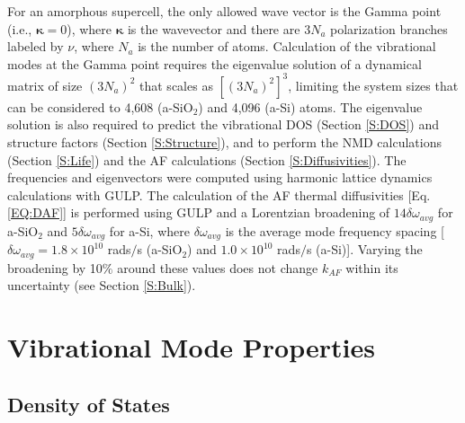 For an amorphous supercell, 
the only allowed wave vector is the Gamma point 
(i.e., $\pmb{\kappa}=0$),  
where $\pmb{\kappa}$ is the wavevector and there are $3N_a$ 
polarization 
branches labeled by $\nu$, where $N_a$ is the number of atoms. 
Calculation of the vibrational modes at the Gamma point  
requires the eigenvalue solution of a dynamical matrix of size 
$(3N_a)^2$ that scales as $[(3N_a)^2]^3$, limiting the system 
sizes that can be considered to 4,608 (a-SiO$_2$) and 4,096 (a-Si) 
atoms. 
The eigenvalue solution is also required to predict the vibrational 
DOS (Section \ref{S:DOS}) and structure factors 
(Section \ref{S:Structure}), and to perform the NMD calculations  
(Section \ref{S:Life})  
and the AF calculations (Section \ref{S:Diffusivities}). 
The frequencies and eigenvectors were computed using harmonic
lattice dynamics calculations with GULP.\cite{gale_general_2003} 
The calculation of the AF thermal diffusivities 
[Eq. \eqref{EQ:DAF}] is performed using GULP and a Lorentzian 
broadening of $14\delta\omega_{avg}$ for a-SiO$_2$ and 
$5\delta\omega_{avg}$ for a-Si, 
where $\delta\omega_{avg}$ is the average mode 
frequency spacing 
[$\delta\omega_{avg} = 1.8 \times 10^{10}$ rads$/$s (a-SiO$_2$) 
and $1.0 \times 10^{10}$ rads$/$s (a-Si)].
\cite{feldman_thermal_1993,feldman_numerical_1999}  
Varying the broadening by 10$\%$ around these values does not 
change $k_{AF}$ within its uncertainty 
(see Section \ref{S:Bulk}).

\section{\label{S:Vibrational}Vibrational Mode Properties}

\subsection{\label{S:DOS}Density of States}

